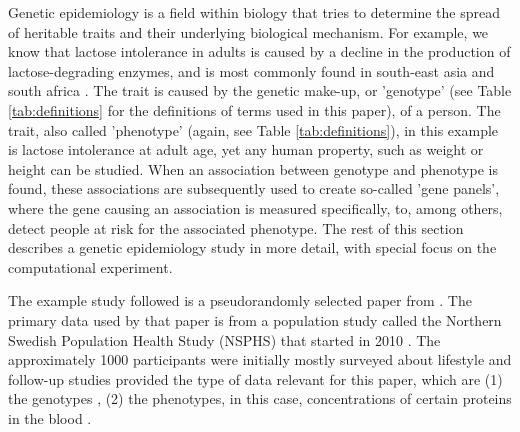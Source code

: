 
Genetic epidemiology is a field within biology that
tries to determine the spread of heritable traits 
and their underlying biological mechanism.
For example, we know that lactose intolerance in adults is
caused by a decline in the production of lactose-degrading enzymes,
and is most commonly found in south-east asia and south africa \cite{storhaug2017country}.
The trait is caused by the genetic make-up, or 'genotype'
(see Table \ref{tab:definitions} for the definitions of terms used in this paper), 
of a person.
The trait, also called 'phenotype' (again, see Table \ref{tab:definitions}), 
in this example is lactose intolerance at adult age,
yet any human property, such as weight or height can be studied.
When an association between genotype and phenotype is found,
these associations are subsequently used to 
create so-called 'gene panels', 
where the gene causing 
an association is measured specifically, to, among others,
detect people at risk for the associated phenotype.
The rest of this section describes a genetic epidemiology study 
in more detail, with special focus on the computational experiment.

The example study followed is a pseudorandomly selected paper
from \cite{ahsan2017relative}. The primary data used by that paper is
from a population study called the Northern Swedish Population
Health Study (NSPHS) that started in 2010 \cite{igl2010northern}. 
The approximately 1000 participants were initially mostly surveyed
about lifestyle \cite{igl2010northern} and follow-up studies
provided the type of data relevant for this paper, 
which are (1) the genotypes \cite{johansson2013identification},
(2) the phenotypes, in this case, concentrations of certain proteins in the 
blood \cite{enroth2014strong,enroth2015effect}.

